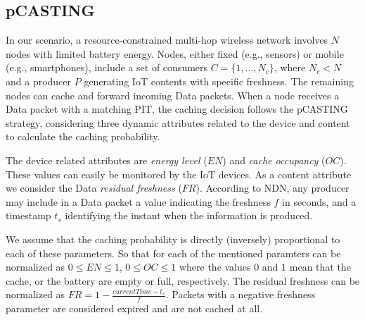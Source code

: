 \documentclass[conference]{IEEEtran}
\begin{document}
\subsection{pCASTING}



In our scenario, a resource-constrained multi-hop wireless network involves $N$ nodes with limited battery energy. Nodes, either fixed 
(e.g., sensors) or mobile (e.g., smartphones), include a set of consumers $C = \{1, ..., N_c\}$, where $N_c < N$ and a producer $P$ generating 
IoT contents with specific freshness. The remaining nodes can cache and forward incoming Data packets. When a node receives a Data packet 
with a matching PIT, the caching decision follows the pCASTING strategy, considering three dynamic attributes related to the device and 
content to calculate the caching probability.

The device related attributes are \textit{energy level} ($EN$) and \textit{cache occupancy} ($OC$). These values can easily be monitored by the
IoT devices. As a content attribute we consider the Data \textit{residual freshness} ($FR$). According to NDN, any producer may include in a Data packet a value indicating the freshness $f$ in seconds,
and a timestamp $t_s$ identifying the instant when the information is produced.

We assume that the caching probability is directly (inversely) proportional to each of these parameters. So that for each of the mentioned paramters can be
normalized as $0 \leq EN \leq 1$, $0 \leq OC \leq 1$ where the values $0$ and $1$ mean that the cache, or the battery are empty or full, respectively.
The residual freshness can be normalized as $ FR = 1 - \frac{currentTime - t_s}{f}$.
Packets with a negative freshness parameter are considered expired and are not cached at all.
\end{document}

